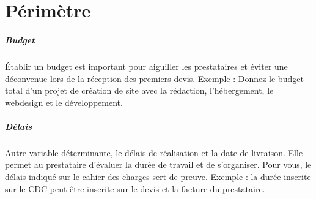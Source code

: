\chapter{Périmètre}
\paragraph{Budget}
Établir un budget est important pour aiguiller les prestataires et éviter une déconvenue lors de la réception des premiers devis. Exemple : Donnez le budget total d’un projet de création de site avec la rédaction, l’hébergement, le webdesign et le développement.
\paragraph{Délais} Autre variable déterminante, le délais de réalisation et la date de livraison. Elle permet au prestataire d’évaluer la durée de travail et de s’organiser. Pour vous, le délais indiqué sur le cahier des charges sert de preuve. Exemple : la durée inscrite sur le CDC peut être inscrite sur le devis et la facture du prestataire.